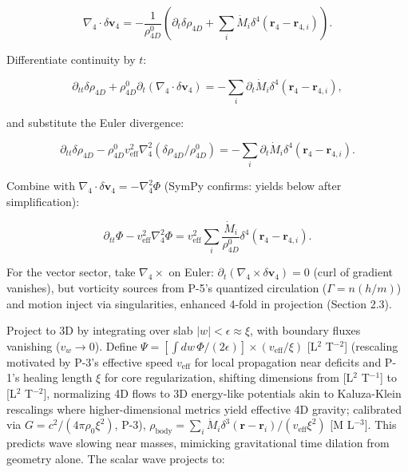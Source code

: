\begin{equation}
\nabla_4 \cdot \delta \mathbf{v}_4 = -\frac{1}{\rho_{4D}^0} \left( \partial_t \delta \rho_{4D} + \sum_i \dot{M}_i \delta^4(\mathbf{r}_4 - \mathbf{r}_{4,i}) \right).
\end{equation}

Differentiate continuity by $t$:

\begin{equation}
\partial_{tt} \delta \rho_{4D} + \rho_{4D}^0 \partial_t (\nabla_4 \cdot \delta \mathbf{v}_4) = -\sum_i \partial_t \dot{M}_i \delta^4(\mathbf{r}_4 - \mathbf{r}_{4,i}),
\end{equation}

and substitute the Euler divergence:

\begin{equation}
\partial_{tt} \delta \rho_{4D} - \rho_{4D}^0 v_{\text{eff}}^2 \nabla_4^2 (\delta \rho_{4D} / \rho_{4D}^0) = -\sum_i \partial_t \dot{M}_i \delta^4(\mathbf{r}_4 - \mathbf{r}_{4,i}).
\end{equation}

Combine with $\nabla_4 \cdot \delta \mathbf{v}_4 = -\nabla_4^2 \Phi$ (SymPy confirms: yields below after simplification):

\begin{equation}
\partial_{tt} \Phi - v_{\text{eff}}^2 \nabla_4^2 \Phi = v_{\text{eff}}^2 \sum_i \frac{\dot{M}_i}{\rho_{4D}^0} \delta^4(\mathbf{r}_4 - \mathbf{r}_{4,i}).
\end{equation}

For the vector sector, take $\nabla_4 \times$ on Euler: $\partial_t (\nabla_4 \times \delta \mathbf{v}_4) = 0$ (curl of gradient vanishes), but vorticity sources from P-5's quantized circulation ($\Gamma = n (h/m)$) and motion inject via singularities, enhanced 4-fold in projection (Section 2.3).

Project to 3D by integrating over slab $|w| < \epsilon \approx \xi$, with boundary fluxes vanishing ($v_w \rightarrow 0$). Define $\Psi = \left[ \int dw \, \Phi / (2\epsilon) \right] \times (v_{\text{eff}} / \xi)$ [L$^2$ T$^{-2}$] (rescaling motivated by P-3's effective speed $v_{\text{eff}}$ for local propagation near deficits and P-1's healing length $\xi$ for core regularization, shifting dimensions from [L$^2$ T$^{-1}$] to [L$^2$ T$^{-2}$], normalizing 4D flows to 3D energy-like potentials akin to Kaluza-Klein rescalings where higher-dimensional metrics yield effective 4D gravity; calibrated via $G = c^2 / (4\pi \rho_0 \xi^2)$, P-3), $\rho_{\text{body}} = \sum_i \dot{M}_i \delta^3(\mathbf{r} - \mathbf{r}_i) / (v_{\text{eff}} \xi^2)$ [M L$^{-3}$]. This predicts wave slowing near masses, mimicking gravitational time dilation from geometry alone. The scalar wave projects to:


